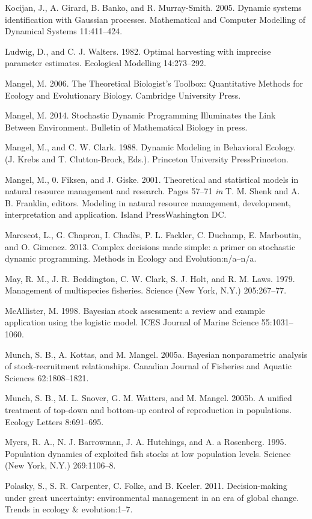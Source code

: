 \documentclass[author-year, 12pt,review]{components/elsarticle} %
\begin{document}
Kocijan, J., A. Girard, B. Banko, and R. Murray-Smith. 2005. Dynamic
systems identification with Gaussian processes. Mathematical and
Computer Modelling of Dynamical Systems 11:411--424.

Ludwig, D., and C. J. Walters. 1982. Optimal harvesting with imprecise
parameter estimates. Ecological Modelling 14:273--292.

Mangel, M. 2006. The Theoretical Biologist's Toolbox: Quantitative
Methods for Ecology and Evolutionary Biology. Cambridge University
Press.

Mangel, M. 2014. Stochastic Dynamic Programming Illuminates the Link
Between Environment. Bulletin of Mathematical Biology in press.

Mangel, M., and C. W. Clark. 1988. Dynamic Modeling in Behavioral
Ecology. (J. Krebs and T. Clutton-Brock, Eds.). Princeton University
PressPrinceton.

Mangel, M., 0. Fiksen, and J. Giske. 2001. Theoretical and statistical
models in natural resource management and research. Pages 57--71
\emph{in} T. M. Shenk and A. B. Franklin, editors. Modeling in natural
resource management, development, interpretation and application. Island
PressWashington DC.

Marescot, L., G. Chapron, I. Chadès, P. L. Fackler, C. Duchamp, E.
Marboutin, and O. Gimenez. 2013. Complex decisions made simple: a primer
on stochastic dynamic programming. Methods in Ecology and
Evolution:n/a--n/a.

May, R. M., J. R. Beddington, C. W. Clark, S. J. Holt, and R. M. Laws.
1979. Management of multispecies fisheries. Science (New York, N.Y.)
205:267--77.

McAllister, M. 1998. Bayesian stock assessment: a review and example
application using the logistic model. ICES Journal of Marine Science
55:1031--1060.

Munch, S. B., A. Kottas, and M. Mangel. 2005a. Bayesian nonparametric
analysis of stock-recruitment relationships. Canadian Journal of
Fisheries and Aquatic Sciences 62:1808--1821.

Munch, S. B., M. L. Snover, G. M. Watters, and M. Mangel. 2005b. A
unified treatment of top-down and bottom-up control of reproduction in
populations. Ecology Letters 8:691--695.

Myers, R. A., N. J. Barrowman, J. A. Hutchings, and A. a Rosenberg.
1995. Population dynamics of exploited fish stocks at low population
levels. Science (New York, N.Y.) 269:1106--8.

Polasky, S., S. R. Carpenter, C. Folke, and B. Keeler. 2011.
Decision-making under great uncertainty: environmental management in an
era of global change. Trends in ecology \& evolution:1--7.
\end{document}
